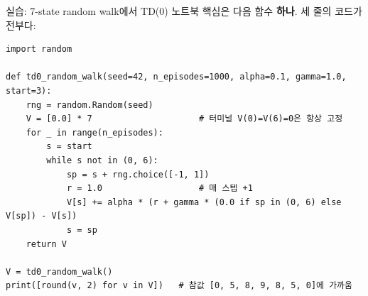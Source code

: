 \begin{frame}[fragile]{실습: 7-state random walk에서 TD(0)}
  노트북 핵심은 다음 함수 \textbf{하나}. 세 줄의 코드가 전부다:
\begin{lstlisting}
import random

def td0_random_walk(seed=42, n_episodes=1000, alpha=0.1, gamma=1.0, start=3):
    rng = random.Random(seed)
    V = [0.0] * 7                     # 터미널 V(0)=V(6)=0은 항상 고정
    for _ in range(n_episodes):
        s = start
        while s not in (0, 6):
            sp = s + rng.choice([-1, 1])
            r = 1.0                   # 매 스텝 +1
            V[s] += alpha * (r + gamma * (0.0 if sp in (0, 6) else V[sp]) - V[s])
            s = sp
    return V

V = td0_random_walk()
print([round(v, 2) for v in V])   # 참값 [0, 5, 8, 9, 8, 5, 0]에 가까움
\end{lstlisting}
\end{frame}
